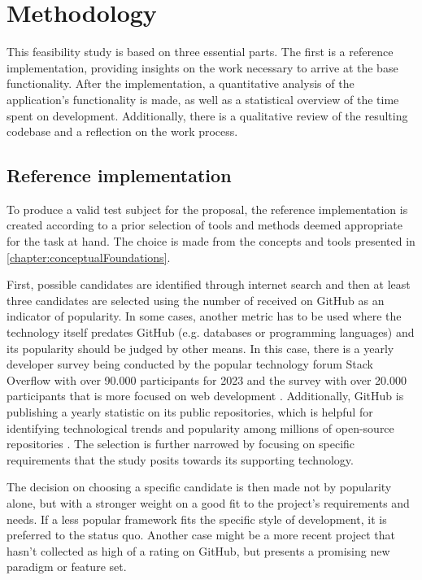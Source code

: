 \chapter{Methodology}
\label{chapter:methodology}

This feasibility study is based on three essential parts. The first is a reference implementation, providing insights on the work necessary to arrive at the base functionality. After the implementation, a quantitative analysis of the application's functionality is made, as well as a statistical overview of the time spent on development. Additionally, there is a qualitative review of the resulting codebase and a reflection on the work process.

\section{Reference implementation}

To produce a valid test subject for the proposal, the reference implementation is created according to a prior selection of tools and methods deemed appropriate for the task at hand. The choice is made from the concepts and tools presented in \autoref{chapter:conceptualFoundations}.

First, possible candidates are identified through internet search and then at least three candidates are selected using the number of  received on GitHub as an indicator of popularity. In some cases, another metric has to be used where the technology itself predates GitHub (e.g. databases or programming languages) and its popularity should be judged by other means. In this case, there is a yearly developer survey being conducted by the popular technology forum Stack Overflow with over 90.000 participants for 2023 \parencite{stackOverflowPoll} and the  survey with over 20.000 participants that is more focused on web development \parencite{stateOfJSSurvey}. Additionally, GitHub is publishing a yearly statistic on its public repositories, which is helpful for identifying technological trends and popularity among millions of open-source repositories \parencite{stateOfTheOctoverse23}. The selection is further narrowed by focusing on specific requirements that the study posits towards its supporting technology.

The decision on choosing a specific candidate is then made not by popularity alone, but with a stronger weight on a good fit to the project's requirements and needs. If a less popular framework fits the specific style of development, it is preferred to the status quo. Another case might be a more recent project that hasn't collected as high of a rating on GitHub, but presents a promising new paradigm or feature set.

